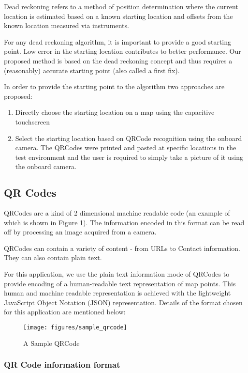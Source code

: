 Dead reckoning refers to a method of position determination where the current
location is estimated based on a known starting location and offsets from the
known location measured via instruments.

For any dead reckoning algorithm, it is important to provide a good starting
point. Low error in the starting location contributes to better performance.
Our proposed method is based on the dead reckoning concept and thus requires 
a (reasonably) accurate starting point (also called a first fix).

In order to provide the starting point to the algorithm two approaches are 
proposed:

\begin{enumerate}
\item Directly choose the starting location on a map using the capacitive 
    touchscreen
\item Select the starting location based on QRCode recognition using the onboard
    camera. The QRCodes were printed and pasted at specific locations 
    in the test environment and the user is required to simply take a 
    picture of it using the onboard camera.
\end{enumerate}

\subsection{QR Codes\label{sec:QRCodes}}
QRCodes are a kind of 2 dimensional machine readable code (an example of which
is shown in Figure \ref{fig:sample_qrcode}). The information encoded in this
format can be read off by processing an image acquired from a camera. 

QRCodes can contain a variety of content - 
from URLs to Contact information. They can also contain plain text. 

For this application, we use the plain text information mode of QRCodes 
to provide encoding of a human-readable text representation of map points. 
This human and machine readable representation is achieved with the lightweight
JavaScript Object Notation (JSON) representation. 
Details of the format chosen for this application are
mentioned below:

\begin{figure}
    \centering
    \texttt{[image: figures/sample\_qrcode]}
    \caption{A Sample QRCode\label{fig:sample_qrcode}}
\end{figure}


\subsubsection{QR Code information format}


